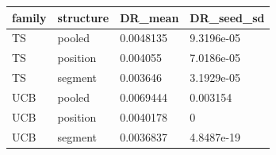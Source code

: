 \begin{tabular}{llll}
\hline
family & structure & DR\_mean & DR\_seed\_sd \\
\hline
TS & pooled & 0.0048135 & 9.3196e-05 \\
TS & position & 0.004055 & 7.0186e-05 \\
TS & segment & 0.003646 & 3.1929e-05 \\
UCB & pooled & 0.0069444 & 0.003154 \\
UCB & position & 0.0040178 & 0 \\
UCB & segment & 0.0036837 & 4.8487e-19 \\
\hline
\end{tabular}